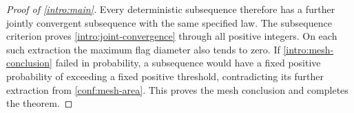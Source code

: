 \begin{proof}[Proof of \cref{intro:main}]
Every deterministic subsequence therefore has a further jointly
convergent subsequence with the same specified law. The subsequence
criterion proves \eqref{intro:joint-convergence} through all positive
integers. On each such extraction the maximum flag diameter also tends
to zero. If \eqref{intro:mesh-conclusion} failed in probability, a
subsequence would have a fixed positive probability of exceeding a
fixed positive threshold, contradicting its further extraction from
\cref{conf:mesh-area}. This proves the mesh conclusion and completes
the theorem.
\end{proof}
